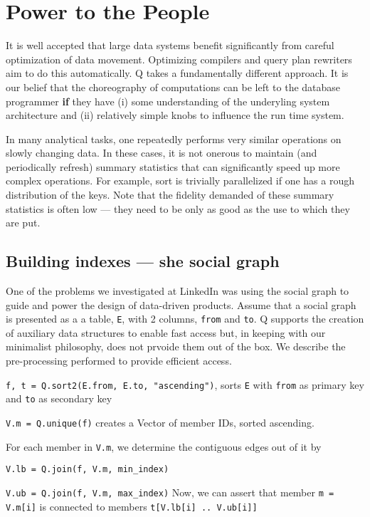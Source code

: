 \section{Power to the People}

It is well accepted that large data systems benefit significantly 
from careful optimization of data movement. Optimizing compilers and query plan
rewriters aim to do this automatically.
Q takes a fundamentally different approach. It is our belief that the
choreography of computations can be left to the database programmer {\bf if} 
they have (i) some understanding of the underyling
system architecture and (ii) relatively simple knobs to influence the run time
system.  

In many analytical tasks, one repeatedly performs very similar operations on slowly
changing data. In these cases, 
it is not onerous to maintain (and periodically refresh) summary statistics that
can significantly speed up more complex operations. For example, sort is
trivially parallelized if one has a rough distribution of the keys.
Note that the fidelity demanded of these summary statistics is often low ---
they need to be only as good as the use to which they are put. 

\subsection{Building indexes --- she social graph}
\label{social_graph}

One of the problems we investigated at LinkedIn was using the social graph to
guide and power the design of data-driven products.
Assume that a social graph is presented as a 
a table, {\tt E}, with 2 columns, {\tt from} and {\tt to}. Q supports the
creation of auxiliary data structures to enable fast access but, in keeping with
our minimalist philosophy, does not prvoide them out of the box. We describe the
pre-processing performed to provide efficient access.
\be
\item {\tt f, t = Q.sort2(E.from, E.to, "ascending")}, sorts {\tt E}
with {\tt from} as primary key and {\tt to} as
secondary key
\item {\tt V.m = Q.unique(f)} creates a Vector of 
member IDs, sorted ascending. 
\item For each member in {\tt V.m}, we determine the contiguous edges out of it
  by 
  \be
\item {\tt V.lb = Q.join(f, V.m, min\_index)}
\item {\tt V.ub = Q.join(f, V.m, max\_index)}
  \ee
Now, we can assert that member
{\tt m = V.m[i]} is connected to members {\tt t[V.lb[i] .. V.ub[i]]}
\ee

